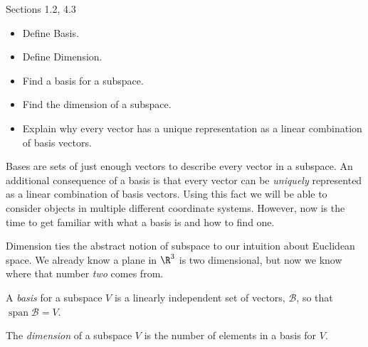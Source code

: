 \documentclass{problemset}
\DeclareMathOperator{\Span}{span}
\begin{document}
\begin{lesson}
	\newpage

	Sections 1.2, 4.3

	\begin{itemize}
		\item Define Basis.
		\item Define Dimension.
		\item Find a basis for a subspace.
		\item Find the dimension of a subspace.
		\item Explain why every vector has a unique representation as a linear
			combination of basis vectors.
	\end{itemize}

	Bases are sets of just enough vectors to describe every vector in a subspace.
	An additional consequence of a basis is that every vector can be \emph{uniquely}
	represented as a linear combination of basis vectors. Using this fact we
	will be able to consider objects in multiple different coordinate systems. However,
	now is the time to get familiar with what a basis is and how to find one.

	Dimension ties the abstract notion of subspace to our intuition about
	Euclidean space. We already know a plane in $\R^3$ is two dimensional,
	but now we know where that number \emph{two} comes from.

	\newpage
\end{lesson}
	\begin{definition}[Basis]
		A \emph{basis} for a subspace $V$ is a linearly independent set of vectors, $\mathcal B$,
		so that $\Span\mathcal B=V$.
	\end{definition}
	\begin{definition}[Dimension]
		The \emph{dimension} of a subspace $V$ is the number of elements in a basis for $V$.
	\end{definition}
\end{document}
